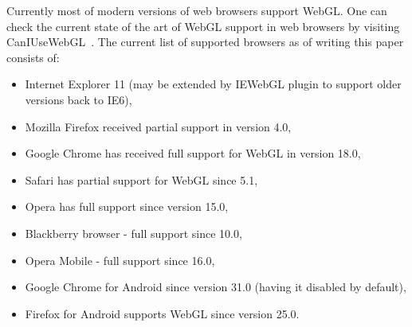 Currently most of modern versions of web browsers support WebGL.
One can check the current state of the art of WebGL support in web browsers by visiting CanIUseWebGL~\cite{webgl_support}.
The current list of supported browsers as of writing this paper consists of:
\begin{itemize}
\item Internet Explorer 11 (may be extended by IEWebGL plugin \cite{iewebgl} to support older versions back to IE6),
\item Mozilla Firefox received partial support in version 4.0,
\item Google Chrome has received full support for WebGL in version 18.0,
\item Safari has partial support for WebGL since 5.1,
\item Opera has full support since version 15.0,
\item Blackberry browser - full support since 10.0,
\item Opera Mobile - full support since 16.0,
\item Google Chrome for Android since version 31.0 (having it disabled by default),
\item Firefox for Android supports WebGL since version 25.0.
\end{itemize}